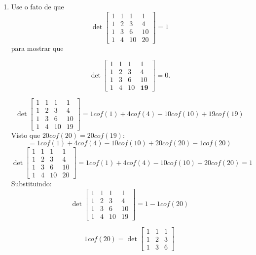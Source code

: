 \documentclass[leqno]{article}
\numberwithin{equation}{section}
\begin{document}
\begin{enumerate}
\begin{sol}
		\end{sol}
		
		
		\item Use o fato de que
		$$\det \begin{bmatrix} 1 & 1 & 1 & 1 \\ 1 & 2 & 3 & 4 \\ 1 & 3 & 6 & 10 \\ 1 & 4 & 10 & 20  \end{bmatrix} = 1$$
		para mostrar que
		
		$$\det \begin{bmatrix} 1 & 1 & 1 & 1 \\ 1 & 2 & 3 & 4 \\ 1 & 3 & 6 & 10 \\ 1 & 4 & 10 & \mathbf{19}  \end{bmatrix} = 0.$$
		
		\begin{sol}
			$$\det \begin{bmatrix}
			1 & 1 & 1 & 1 \\
			1 & 2 & 3 & 4 \\
			1 & 3 & 6 & 10 \\
			1 & 4 & 10 & 19
		  \end{bmatrix} = 1 cof(1) + 4 cof(4) - 10 cof(10) + 19 cof(19)$$
	   Visto que $20 cof(20) = 20 cof(19)$:
		$$= 1 cof(1) + 4 cof(4) - 10 cof(10) + 20 cof(20) - 1 cof(20)$$
		$$\det \begin{bmatrix}
			1 & 1 & 1 & 1 \\
			1 & 2 & 3 & 4 \\
			1 & 3 & 6 & 10 \\
			1 & 4 & 10 & 20 
		\end{bmatrix} = 1 cof(1) + 4 cof(4) - 10 cof(10) + 20 cof(20) = 1$$
		Substituindo:
		$$\det \begin{bmatrix}
			1 & 1 & 1 & 1 \\
			1 & 2 & 3 & 4 \\
			1 & 3 & 6 & 10 \\
			1 & 4 & 10 & 19
		\end{bmatrix} = 1 - 1 cof(20)$$
		
		$$1 cof(20) = \det \begin{bmatrix}
			1 & 1 & 1  \\
			1 & 2 & 3  \\
			1 & 3 & 6 
		\end{bmatrix}$$
	

\end{sol}
\end{enumerate}
\end{document}
